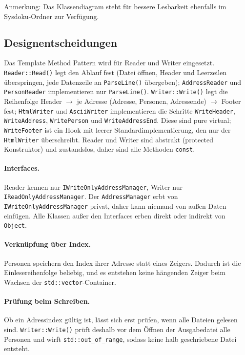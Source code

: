 \documentclass[a4paper,12pt]{article}
\begin{document}
Anmerkung: Das Klassendiagram steht für bessere Lesbarkeit ebenfalls im Sysdoku-Ordner zur Verfügung.

\subsection{Designentscheidungen}
Das Template Method Pattern wird für Reader und Writer eingesetzt. \texttt{Reader::Read()}
legt den Ablauf fest (Datei öffnen, Header und Leerzeilen überspringen, jede Datenzeile
an \texttt{ParseLine()} übergeben); \texttt{AddressReader} und \texttt{PersonReader}
implementieren nur \texttt{ParseLine()}. \texttt{Writer::Write()} legt die Reihenfolge
Header $\rightarrow$ je Adresse (Adresse, Personen, Adressende) $\rightarrow$ Footer fest;
\texttt{HtmlWriter} und \texttt{AsciiWriter} implementieren die Schritte
\texttt{WriteHeader}, \texttt{WriteAddress}, \texttt{WritePerson} und
\texttt{WriteAddressEnd}. Diese sind pure virtual; \texttt{WriteFooter} ist ein Hook mit
leerer Standardimplementierung, den nur der \texttt{HtmlWriter} überschreibt.
Reader und Writer sind abstrakt (protected Konstruktor) und zustandslos, daher sind alle
Methoden \texttt{const}.

\paragraph{Interfaces.} Reader kennen nur \texttt{IWriteOnlyAddressManager},
Writer nur \texttt{IReadOnlyAddressManager}. Der \texttt{AddressManager} erbt von
\texttt{IWriteOnlyAddressManager} privat, daher kann niemand von außen Daten einfügen.
Alle Klassen außer den Interfaces erben direkt oder indirekt von \texttt{Object}.

\paragraph{Verknüpfung über Index.} Personen speichern den Index ihrer Adresse statt eines
Zeigers. Dadurch ist die Einlesereihenfolge beliebig, und es entstehen keine hängenden
Zeiger beim Wachsen der \texttt{std::vector}-Container.

\paragraph{Prüfung beim Schreiben.} Ob ein Adressindex gültig ist, lässt sich erst prüfen,
wenn alle Dateien gelesen sind. \texttt{Writer::Write()} prüft deshalb vor dem Öffnen der
Ausgabedatei alle Personen und wirft \texttt{std::out\_of\_range}, sodass keine halb
geschriebene Datei entsteht.
\end{document}
